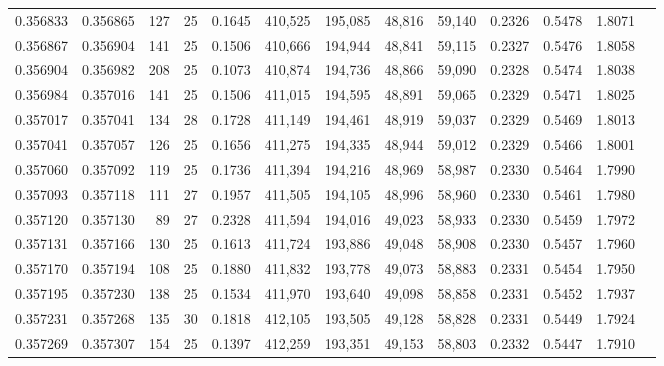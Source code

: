 \begin{tabular}{rrrrrrrrrrrrr}
0.356833 & 0.356865 &   127 &  25 &                                     0.1645 & 410,525 & 195,085 &  48,816 &  59,140 & 0.2326 & 0.5478 & 1.8071 \\
0.356867 & 0.356904 &   141 &  25 &                                     0.1506 & 410,666 & 194,944 &  48,841 &  59,115 & 0.2327 & 0.5476 & 1.8058 \\
0.356904 & 0.356982 &   208 &  25 &                                     0.1073 & 410,874 & 194,736 &  48,866 &  59,090 & 0.2328 & 0.5474 & 1.8038 \\
0.356984 & 0.357016 &   141 &  25 &                                     0.1506 & 411,015 & 194,595 &  48,891 &  59,065 & 0.2329 & 0.5471 & 1.8025 \\
0.357017 & 0.357041 &   134 &  28 &                                     0.1728 & 411,149 & 194,461 &  48,919 &  59,037 & 0.2329 & 0.5469 & 1.8013 \\
0.357041 & 0.357057 &   126 &  25 &                                     0.1656 & 411,275 & 194,335 &  48,944 &  59,012 & 0.2329 & 0.5466 & 1.8001 \\
0.357060 & 0.357092 &   119 &  25 &                                     0.1736 & 411,394 & 194,216 &  48,969 &  58,987 & 0.2330 & 0.5464 & 1.7990 \\
0.357093 & 0.357118 &   111 &  27 &                                     0.1957 & 411,505 & 194,105 &  48,996 &  58,960 & 0.2330 & 0.5461 & 1.7980 \\
0.357120 & 0.357130 &    89 &  27 &                                     0.2328 & 411,594 & 194,016 &  49,023 &  58,933 & 0.2330 & 0.5459 & 1.7972 \\
0.357131 & 0.357166 &   130 &  25 &                                     0.1613 & 411,724 & 193,886 &  49,048 &  58,908 & 0.2330 & 0.5457 & 1.7960 \\
0.357170 & 0.357194 &   108 &  25 &                                     0.1880 & 411,832 & 193,778 &  49,073 &  58,883 & 0.2331 & 0.5454 & 1.7950 \\
0.357195 & 0.357230 &   138 &  25 &                                     0.1534 & 411,970 & 193,640 &  49,098 &  58,858 & 0.2331 & 0.5452 & 1.7937 \\
0.357231 & 0.357268 &   135 &  30 &                                     0.1818 & 412,105 & 193,505 &  49,128 &  58,828 & 0.2331 & 0.5449 & 1.7924 \\
0.357269 & 0.357307 &   154 &  25 &                                     0.1397 & 412,259 & 193,351 &  49,153 &  58,803 & 0.2332 & 0.5447 & 1.7910 \\

\end{tabular}
